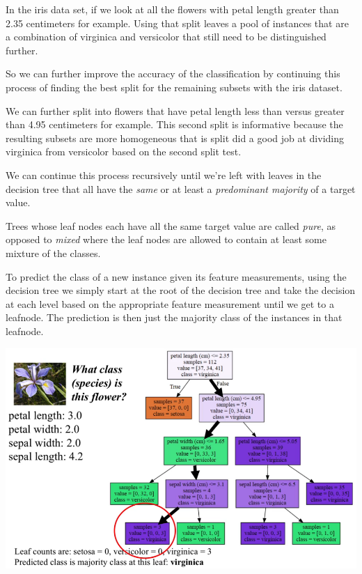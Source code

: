 \begin{multicols}{2}
In the iris data set, if we look at all the flowers with petal length greater than 2.35 centimeters for example. Using that split leaves a pool of instances that are a combination of virginica and versicolor that still need to be distinguished further. 

So we can further improve the accuracy of the classification by continuing this process of finding the best split for the remaining subsets with the iris dataset. 

We can further split into flowers that have petal length less than versus greater than 4.95 centimeters for example. This second split is informative because the resulting subsets are more homogeneous that is split did a good job at dividing virginica from versicolor based on the second split test. 

We can continue this process recursively until we're left with leaves in the decision tree that all have the \emph{same} or at least a \emph{predominant majority} of a target value. 

Trees whose leaf nodes each have all the same target value are called \emph{pure}, as opposed to \emph{mixed} where the leaf nodes are allowed to contain at least some mixture of the classes. 

To predict the class of a new instance given its feature measurements, using the decision tree we simply start at the root of the decision tree and take the decision at each level based on the appropriate feature measurement until we get to a leafnode. The prediction is then just the majority class of the instances in that leafnode. 

\begin{center}
	\includegraphics[width=\linewidth]{img/Decision-Tree-2.png} 
\end{center} 



\end{multicols}
